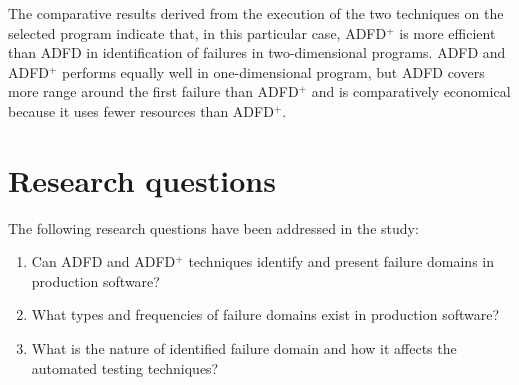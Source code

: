 The comparative results derived from the execution of the two techniques on the selected program indicate that, in this particular case, ADFD$^+$ is more efficient than ADFD in identification of failures in two-dimensional programs. ADFD and ADFD$^+$ performs equally well in one-dimensional program, but ADFD covers more range around the first failure than ADFD$^+$ and is comparatively economical because it uses fewer resources than ADFD$^+$.


\section{Research questions} \label{sec:questions}
The following research questions have been addressed in the study:
\begin{enumerate}
%
\item Can ADFD and ADFD$^+$ techniques identify and present failure domains in production software? %

%
%
\item What types and frequencies of failure domains exist in production software? %
%
\item What is the nature of identified failure domain and how it affects the automated testing techniques? %


\end{enumerate}
